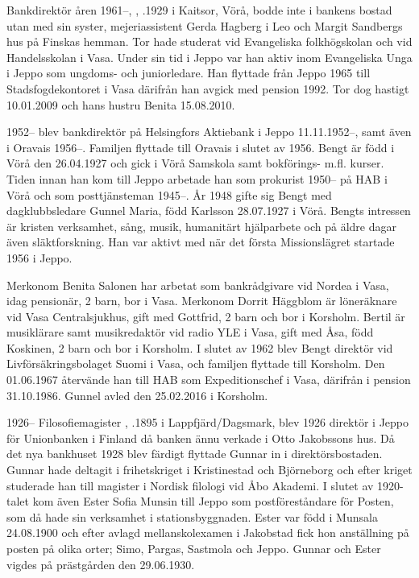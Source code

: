 Bankdirektör åren 1961--, , .1929 i Kaitsor, Vörå, bodde inte i bankens bostad utan med sin syster, mejeriassistent Gerda Hagberg i Leo och Margit Sandbergs hus på Finskas hemman. Tor hade studerat vid Evangeliska folkhögskolan och vid Handelsskolan i Vasa. Under sin tid i Jeppo var han aktiv inom Evangeliska Unga i	Jeppo som ungdoms- och juniorledare. Han flyttade från Jeppo 1965 till Stadsfogdekontoret i Vasa därifrån han avgick med pension 1992. Tor dog hastigt 10.01.2009 och hans hustru Benita 15.08.2010.


1952--
 blev bankdirektör på Helsingfors Aktiebank i Jeppo 11.11.1952--, samt även i Oravais 1956--. Familjen flyttade till Oravais i slutet av 1956. Bengt är född i Vörå den 26.04.1927 och gick i Vörå Samskola samt bokförings- m.fl. kurser. Tiden innan han kom till Jeppo arbetade han som prokurist 1950-- på HAB i Vörå och som posttjänsteman 1945--. År 1948 gifte sig Bengt med dagklubbsledare Gunnel Maria, född Karlsson 28.07.1927 i Vörå. Bengts intressen är kristen verksamhet, sång, musik, humanitärt hjälparbete och på äldre dagar även släktforskning. Han var aktivt med när det första Missionslägret startade 1956 i Jeppo.
\begin{jhchildren}
  \item {}
  \item {}
  \item {}
\end{jhchildren}
Merkonom Benita Salonen har arbetat som bankrådgivare vid Nordea i Vasa, idag pensionär, 2 barn, bor i Vasa. Merkonom Dorrit Häggblom är löneräknare vid Vasa Centralsjukhus, gift med Gottfrid, 2 barn och bor i Korsholm. Bertil är musiklärare samt musikredaktör vid radio YLE i Vasa, gift med Åsa, född Koskinen, 2 barn och bor i Korsholm. I slutet av 1962 blev Bengt direktör vid Livförsäkringsbolaget Suomi i Vasa, och familjen flyttade till Korsholm. Den 01.06.1967 återvände han till HAB som Expeditionschef i Vasa, därifrån i pension  31.10.1986. Gunnel avled den 25.02.2016 i Korsholm.


1926--
Filosofiemagister , .1895 i Lappfjärd/Dagsmark, blev 1926 direktör i Jeppo för 	Unionbanken i Finland då banken ännu verkade i Otto Jakobssons hus. Då det nya bankhuset 1928 blev färdigt flyttade Gunnar in i direktörsbostaden. Gunnar hade deltagit i frihetskriget i Kristinestad och Björneborg och efter kriget studerade han till magister i Nordisk filologi vid Åbo Akademi. I slutet av 1920-talet kom även Ester Sofia Munsin till Jeppo som postföreståndare för Posten, som då hade sin verksamhet i stationsbyggnaden. Ester var född i Munsala 24.08.1900 och efter avlagd mellanskolexamen i Jakobstad fick hon anställning på posten på olika orter; Simo, Pargas, Sastmola och Jeppo. Gunnar och Ester vigdes på prästgården den 29.06.1930.

